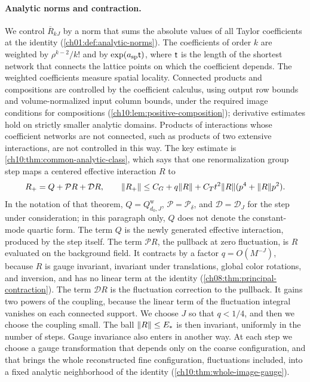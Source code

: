 \paragraph{Analytic norms and contraction.}
We control $\overline R_{kJ}$ by a norm that sums the absolute values of all Taylor coefficients at the identity (\cref{ch01:def:analytic-norms}). The coefficients of order $k$ are weighted by $\rho^{k-2}/k!$ and by $\exp(a_{\mathrm{sp}}\mathsf t)$, where $\mathsf t$ is the length of the shortest network that connects the lattice points on which the coefficient depends. The weighted coefficients measure spatial locality. Connected products and compositions are controlled by the coefficient calculus, using output row bounds and volume-normalized input column bounds, under the required image conditions for compositions (\cref{ch10:lem:positive-composition}); derivative estimates hold on strictly smaller analytic domains. Products of interactions whose coefficient networks are not connected, such as products of two extensive interactions, are not controlled in this way. The key estimate is \cref{ch10:thm:common-analytic-class}, which says that one renormalization group step maps a centered effective interaction $R$ to
\[
 R_+=Q+\mathcal P R+\mathcal D R,\qquad \lVert R_+\rVert\le C_G+q\lVert R\rVert+C_Tt^2\lVert R\rVert(p^4+\lVert R\rVert p^2).
\]
In the notation of that theorem, $Q=Q_{d_0,J}^{\mathrm w}$, $\mathcal P=\mathcal P_\delta$, and $\mathcal D=\mathcal D_J$ for the step under consideration; in this paragraph only, $Q$ does not denote the constant-mode quartic form. The term $Q$ is the newly generated effective interaction, produced by the step itself. The term $\mathcal PR$, the pullback at zero fluctuation, is $R$ evaluated on the background field. It contracts by a factor $q=O(M^{-J})$, because $R$ is gauge invariant, invariant under translations, global color rotations, and inversion, and has no linear term at the identity (\cref{ch08:thm:principal-contraction}). The term $\mathcal DR$ is the fluctuation correction to the pullback. It gains two powers of the coupling, because the linear term of the fluctuation integral vanishes on each connected support. We choose $J$ so that $q<1/4$, and then we choose the coupling small. The ball $\lVert R\rVert\le E_*$ is then invariant, uniformly in the number of steps. Gauge invariance also enters in another way. At each step we choose a gauge transformation that depends only on the coarse configuration, and that brings the whole reconstructed fine configuration, fluctuations included, into a fixed analytic neighborhood of the identity (\cref{ch10:thm:whole-image-gauge}).

